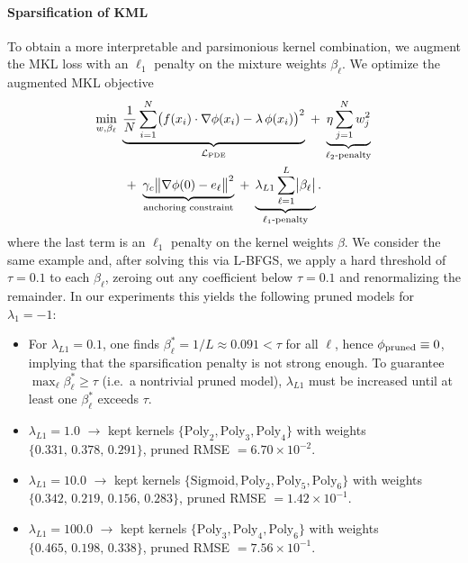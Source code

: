 \documentclass[11pt]{article}
\theoremstyle{plain}
\def\[{\begin{equation}}
\def\]{\end{equation}}
\begin{document}
\paragraph{Sparsification of KML}
To obtain a more interpretable and parsimonious kernel combination, we augment the MKL loss with an \(\ell_{1}\) penalty on the mixture weights \(\beta_{\ell}\). 
We optimize the augmented MKL objective
\[
\begin{aligned}
\min_{w,\beta_{\ell}}\;&
\underbrace{\frac{1}{N}\sum_{i=1}^N\bigl(f(x_i)\cdot\nabla\phi(x_i)-\lambda\,\phi(x_i)\bigr)^2}_{\mathcal{L}_{\rm PDE}}
\;+\;\underbrace{\eta\sum_{j=1}^N w_j^2}_{\ell_2\text{-penalty}}\\
&\;+\;\underbrace{\gamma_c\bigl\|\nabla\phi(0)-e_{\ell}\bigr\|^2}_{\text{anchoring constraint}}
\;+\;\underbrace{\lambda_{L1}\sum_{\ell=1}^L\bigl|\beta_{\ell}\bigr|}_{\ell_1\text{-penalty}}.
\end{aligned}
\]
where the last term is an \(\ell_{1}\) penalty on the kernel weights \(\beta\).  We consider the same example and, after solving this via L-BFGS, we apply a hard threshold of $\tau=0.1$ to each \(\beta_{\ell}\), zeroing out any coefficient below $\tau=0.1$ and renormalizing the remainder.  In our experiments this yields the following pruned models for $\lambda_1=-1$:

\begin{itemize}
\item       For \(\lambda_{L1}=0.1\), one finds \(\beta^*_\ell=1/L\approx0.091<\tau\) for all \(\ell\), hence  \(\phi_{\rm pruned}\equiv0\), implying that the sparsification penalty is not strong enough.  
    To guarantee \(\max_\ell\beta^*_\ell\ge\tau\) (i.e.\ a nontrivial pruned model), \(\lambda_{L1}\) must be increased until at least one \(\beta^*_\ell\) exceeds \(\tau\).
 

  \item \(\lambda_{L1} = 1.0\) \(\longrightarrow\) kept kernels \(\{\mathrm{Poly}_2, \mathrm{Poly}_3, \mathrm{Poly}_4\}\) with weights \(\{0.331,\,0.378,\,0.291\}\), pruned RMSE \(=6.70\times10^{-2}\).
  \item \(\lambda_{L1} = 10.0\) \(\longrightarrow\) kept kernels \(\{\mathrm{Sigmoid}, \mathrm{Poly}_2, \mathrm{Poly}_5, \mathrm{Poly}_6\}\) with weights \(\{0.342,\,0.219,\,0.156,\,0.283\}\), pruned RMSE \(=1.42\times10^{-1}\).
  \item \(\lambda_{L1} = 100.0\) \(\longrightarrow\) kept kernels \(\{\mathrm{Poly}_3, \mathrm{Poly}_4, \mathrm{Poly}_6\}\) with weights \(\{0.465,\,0.198,\,0.338\}\), pruned RMSE \(=7.56\times10^{-1}\).
\end{itemize}
 
\end{document}
